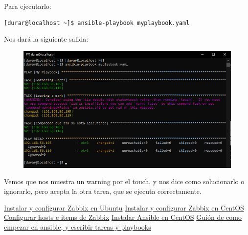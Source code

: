 \documentclass[a4paper]{article}
\begin{document}
\newline Para ejecutarlo:
\begin{lstlisting}[style=bashCentOS]
    [durar@localhost ~]$ ansible-playbook myplaybook.yaml
\end{lstlisting}
Nos dará la siguiente salida:
\begin{figure}[hbt!]
    \centering
    \includegraphics[width=\textwidth]{salida de playbook.png}
\end{figure}
\newline Vemos que nos muestra un warning por el touch, y nos dice como solucionarlo o ignorarlo, pero 
acepta la otra tarea, que se ejecuta correctamente.
\newpage
\begin{thebibliography}{99}
    \href{https://www.zabbix.com/la/download?zabbix=5.0&os_distribution=ubuntu&os_version=20.04_focal&db=mysql&ws=apache}{Instalar y configurar Zabbix en Ubuntu}
    \href{https://www.zabbix.com/la/download?zabbix=5.0&os_distribution=centos&os_version=8&db=mysql&ws=apache}{Instalar y configurar Zabbix en CentOS}
    \href{https://www.zabbix.com/documentation/5.0/manual/config}{Configurar hosts e items de Zabbix} 
    \href{https://docs.ansible.com/ansible/latest/installation_guide/intro_installation.html#installing-ansible-on-rhel-centos-or-fedora}{Instalar Ansible en CentOS} 
    \href{https://docs.ansible.com/ansible/latest/user_guide/index.html#getting-started}{Guión de como empezar en ansible, y escribir tareas y playbooks}
\end{thebibliography}
\end{document}
